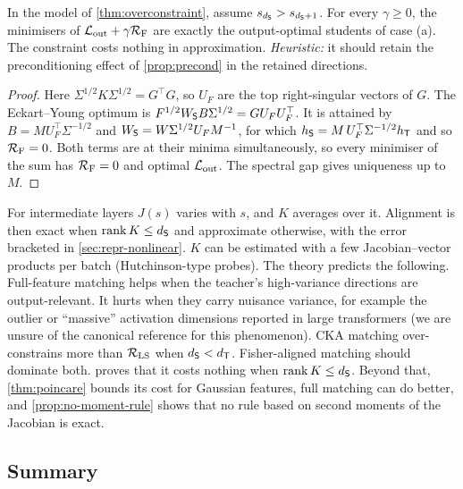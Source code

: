 \begin{proposition}\label{prop:fisher-rep}
\Mo\Ck In the model of \cref{thm:overconstraint}, assume $s_{d_{\mathsf{S}}}>s_{d_{\mathsf{S}}+1}$. For every $\gamma\ge0$, the minimisers
of $\mathcal{L}_{\mathrm{out}}+\gamma\mathcal{R}_{\mathrm F}$ are exactly the output-optimal students of case (a). The constraint costs
nothing in approximation. \emph{Heuristic:} it should retain the preconditioning effect of
\cref{prop:precond} in the retained directions.
\end{proposition}
\begin{proof}
Here $\Sigma^{1/2}K\Sigma^{1/2}=G^\top G$, so $U_F$ are the top right-singular vectors of $G$. The Eckart--Young
optimum is $F^{1/2}W_{\mathsf{S}} B\Sigma^{1/2}=GU_FU_F^\top$. It is attained by $B=MU_F^\top\Sigma^{-1/2}$ and
$W_{\mathsf{S}}=W\Sigma^{1/2}U_FM^{-1}$, for which $h_{\mathsf{S}}=M\,U_F^\top\Sigma^{-1/2}h_{\mathsf{T}}$ and so $\mathcal{R}_{\mathrm F}=0$. Both terms are at
their minima simultaneously, so every minimiser of the sum has $\mathcal{R}_{\mathrm F}=0$ and optimal $\mathcal{L}_{\mathrm{out}}$.
The spectral gap gives uniqueness up to $M$.
\end{proof}

\begin{heuristic}\label{heur:repr-deep}
For intermediate layers $J(s)$ varies with $s$, and $K$ averages over it. Alignment is then exact when
$\operatorname{rank} K\le d_{\mathsf{S}}$ and approximate otherwise, with the error bracketed in \cref{sec:repr-nonlinear}. $K$ can be estimated
with a few Jacobian--vector products per batch (Hutchinson-type probes). The
theory predicts the following. Full-feature matching helps when the teacher's high-variance directions
are output-relevant. It hurts when they carry nuisance variance, for example the outlier or ``massive''
activation dimensions reported in large transformers (we are unsure of the canonical reference for this
phenomenon). CKA matching over-constrains more than $\mathcal{R}_{\mathrm{LS}}$ when $d_{\mathsf{S}}<d_{\mathsf{T}}$. Fisher-aligned matching
should dominate both.  proves that it costs nothing when $\operatorname{rank} K\le d_{\mathsf{S}}$. Beyond that,
\cref{thm:poincare} bounds its cost for Gaussian features, full matching can do better, and \cref{prop:no-moment-rule}
shows that no rule based on second moments of the Jacobian is exact.
\end{heuristic}



\subsection{Summary}

